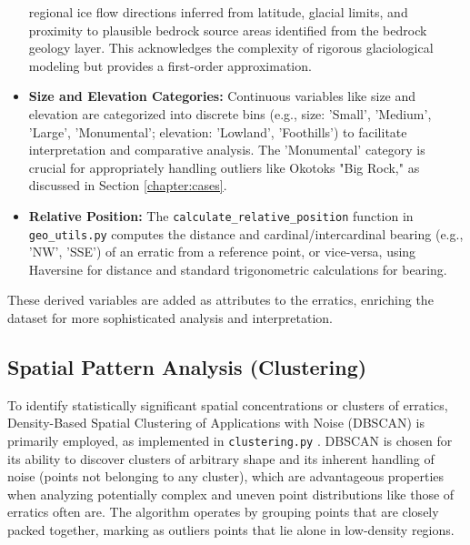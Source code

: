 \documentclass[
11pt, %
english, %
singlespacing, %
headsepline, %
]{MastersDoctoralThesis} %
\begin{document}
\begin{itemize}
    regional ice flow directions inferred from latitude, 
    glacial limits, and proximity to plausible bedrock source areas identified from the 
    bedrock geology layer. This acknowledges the complexity of rigorous glaciological 
    modeling but provides a first-order approximation.
    \item \textbf{Size and Elevation Categories:} Continuous variables like size and 
    elevation are categorized into discrete bins (e.g., size: 'Small', 'Medium', 'Large', 
    'Monumental'; elevation: 'Lowland', 'Foothills') to facilitate interpretation and 
    comparative analysis. The 'Monumental' category is crucial for appropriately handling 
    outliers like Okotoks "Big Rock," as discussed in Section \ref{chapter:cases}.
    \item \textbf{Relative Position:} The \texttt{calculate\_relative\_position} function 
    in \\ \texttt{geo\_utils.py} computes the distance and cardinal/intercardinal bearing 
    (e.g., 'NW', 'SSE') of an erratic from a reference point, or vice-versa, using 
    Haversine for distance and standard trigonometric calculations for bearing.
\end{itemize}
These derived variables are added as attributes to the erratics, enriching the dataset for more sophisticated analysis and interpretation.

\subsection{Spatial Pattern Analysis (Clustering)}
\label{subsec:clustering}

To identify statistically significant spatial concentrations or clusters of erratics, Density-Based Spatial Clustering of Applications with Noise (DBSCAN) is primarily employed, as implemented in \texttt{clustering.py} \cite{Ester1996}. DBSCAN is chosen for its ability to discover clusters of arbitrary shape and its inherent handling of noise (points not belonging to any cluster), which are advantageous properties when analyzing potentially complex and uneven point distributions like those of erratics often are. The algorithm operates by grouping points that are closely packed together, marking as outliers points that lie alone in low-density regions.
\end{document}
